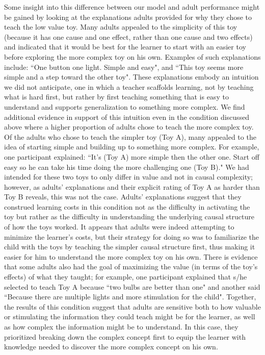 \documentclass[10pt,letterpaper]{article}
\begin{document}
Some insight into this difference between our model and adult performance might be gained by looking at the explanations adults provided for why they chose to teach the low value toy. Many adults appealed to the simplicity of this toy (because it has one cause and one effect, rather than one cause and two effects) and indicated that it would be best for the learner to start with an easier toy before exploring the more complex toy on his own. Examples of such explanations include: ``One button one light. Simple and easy", and ``This toy seems more simple and a step toward the other toy". 
These explanations embody an intuition we did not anticipate, one in which a teacher scaffolds learning, not by teaching what is hard first, but rather by first teaching something that is easy to understand and supports generalization to something more complex. We find additional evidence in support of this intuition even in the condition discussed above where a higher proportion of adults chose to teach the more complex toy. Of the adults who chose to teach the simpler toy (Toy A), many appealed to the idea of starting simple and building up to something more complex. For example, one participant explained: ``It's (Toy A) more simple then the other one. Start off easy so he can take his time doing the more challenging one (Toy B)." 
We had intended for these two toys to only differ in value and not in causal complexity; however, as adults' explanations and their explicit rating of Toy A as harder than Toy B reveals, this was not the case.
Adults' explanations suggest that they construed learning costs in this condition not as the difficulty in activating the toy but rather as the difficulty in understanding the underlying causal structure of how the toys worked. 
It appears that adults were indeed attempting to minimize the learner's costs, but their strategy for doing so was to familiarize the child with the toys by teaching the simpler causal structure first, thus making it easier for him to understand the more complex toy on his own. There is evidence that some adults also had the goal of maximizing the value (in terms of the toy's effects) of what they taught; for example, one participant explained that s/he selected to teach Toy A because ``two bulbs are better than one" and another said ``Because there are multiple lights and more stimulation for the child". Together, the results of this condition suggest that adults are sensitive both to how valuable or stimulating the information they could teach might be for the learner, as well as how complex the information might be to understand. In this case, they prioritized breaking down the complex concept first to equip the learner with knowledge needed to discover the more complex concept on his own.
\end{document}
